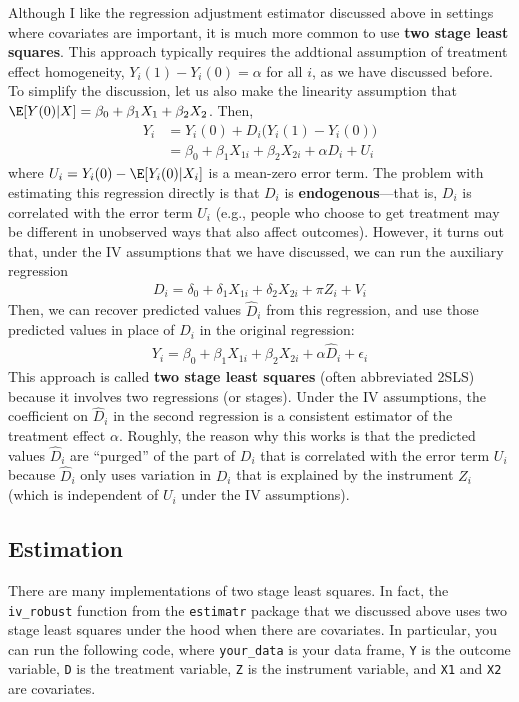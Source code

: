 \documentclass[
  letterpaper,
  DIV=11,
  numbers=noendperiod]{scrreprt}
\begin{document}
Although I like the regression adjustment estimator discussed above in
settings where covariates are important, it is much more common to use
\textbf{two stage least squares}. This approach typically requires the
addtional assumption of treatment effect homogeneity,
\(Y_i(1) - Y_i(0) = \alpha\) for all \(i\), as we have discussed before.
To simplify the discussion, let us also make the linearity assumption
that \(\E[Y(0)|X] = \beta_0 + \beta_1 X_1 + \beta_2 X_2\). Then,
\begin{align*}
  Y_i &= Y_i(0) + D_i \big(Y_i(1) - Y_i(0)\big) \\
      &= \beta_0 + \beta_1 X_{1i} + \beta_2 X_{2i} + \alpha D_i + U_i
\end{align*} where \(U_i = Y_i(0) - \E[Y_i(0)|X_i]\) is a mean-zero
error term. The problem with estimating this regression directly is that
\(D_i\) is \textbf{endogenous}---that is, \(D_i\) is correlated with the
error term \(U_i\) (e.g., people who choose to get treatment may be
different in unobserved ways that also affect outcomes). However, it
turns out that, under the IV assumptions that we have discussed, we can
run the auxiliary regression \begin{align*}
  D_i = \delta_0 + \delta_1 X_{1i} + \delta_2 X_{2i} + \pi Z_i + V_i
\end{align*} Then, we can recover predicted values \(\hat{D}_i\) from
this regression, and use those predicted values in place of \(D_i\) in
the original regression: \begin{align*}
  Y_i = \beta_0 + \beta_1 X_{1i} + \beta_2 X_{2i} + \alpha \hat{D}_i + \epsilon_i
\end{align*} This approach is called \textbf{two stage least squares}
(often abbreviated 2SLS) because it involves two regressions (or
stages). Under the IV assumptions, the coefficient on \(\hat{D}_i\) in
the second regression is a consistent estimator of the treatment effect
\(\alpha\). Roughly, the reason why this works is that the predicted
values \(\hat{D}_i\) are ``purged'' of the part of \(D_i\) that is
correlated with the error term \(U_i\) because \(\hat{D}_i\) only uses
variation in \(D_i\) that is explained by the instrument \(Z_i\) (which
is independent of \(U_i\) under the IV assumptions).

\subsection{Estimation}\label{estimation-3}

There are many implementations of two stage least squares. In fact, the
\texttt{iv\_robust} function from the \texttt{estimatr} package that we
discussed above uses two stage least squares under the hood when there
are covariates. In particular, you can run the following code, where
\texttt{your\_data} is your data frame, \texttt{Y} is the outcome
variable, \texttt{D} is the treatment variable, \texttt{Z} is the
instrument variable, and \texttt{X1} and \texttt{X2} are covariates.
\end{document}

